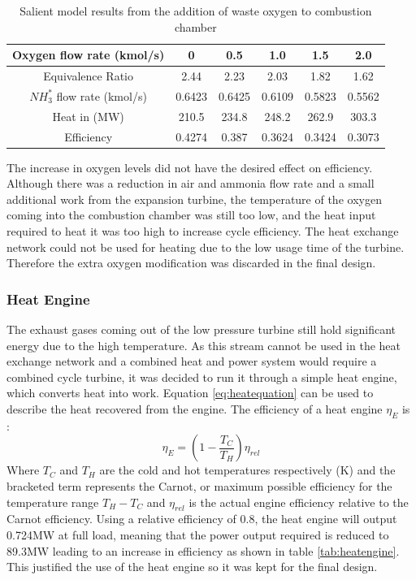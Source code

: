\documentclass[11pt, oneside]{article}
\begin{document}
\begin {table} [h]
\begin{center}
\caption{Salient model results from the addition of waste oxygen to combustion chamber} \label{tab:extraox} 
\begin{tabular}{ |c|c|c|c|c|c| }
 \hline
  Oxygen flow rate (kmol/s) & 0 & 0.5 & 1.0 & 1.5 & 2.0\\ 
   \hline
  Equivalence Ratio & 2.44 & 2.23 & 2.03 & 1.82 & 1.62\\
    \hline
  $NH_3^*$ flow rate (kmol/s) & 0.6423 & 0.6425 & 0.6109 & 0.5823 & 0.5562\\ 
    \hline
  Heat in (MW) & 210.5 & 234.8 & 248.2 & 262.9 & 303.3 \\
  \hline
  Efficiency & 0.4274 & 0.387 & 0.3624 & 0.3424 & 0.3073\\ 
 \hline
\end{tabular}
\end{center}  
\end {table} 
The increase in oxygen levels did not have the desired effect on efficiency. Although there was a reduction in air and ammonia flow rate and a small additional work from the expansion turbine, the temperature of the oxygen coming into the combustion chamber was still too low, and the heat input required to heat it was too high to increase cycle efficiency. The heat exchange network could not be used for heating due to the low usage time of the turbine. Therefore the extra oxygen modification was discarded in the final design.


\subsubsection{Heat Engine}
The exhaust gases coming out of the low pressure turbine still hold significant energy due to the high temperature. As this stream cannot be used in the heat exchange network and a combined heat and power system would require a combined cycle turbine, it was decided to run it through a simple heat engine, which converts heat into work. Equation \ref{eq:heatequation} can be used to describe the heat recovered from the engine. The efficiency of a heat engine $\eta_E$ is \cite{thermonotes}:
\begin{equation}
\eta_E = (1 - \frac{T_C}{T_H}) \eta_{rel} 
\end{equation}
Where $T_C$ and $T_H$ are the cold and hot temperatures respectively (K) and the bracketed term represents the Carnot, or maximum possible efficiency for the temperature range $T_H - T_C$ and $\eta_{rel}$ is the actual engine efficiency relative to the Carnot efficiency. Using a relative efficiency of 0.8, the heat engine will output 0.724MW at full load, meaning that the power output required is reduced to 89.3MW leading to an increase in efficiency as shown in table \ref{tab:heatengine}. This justified the use of the heat engine so it was kept for the final design.
\end{document}
